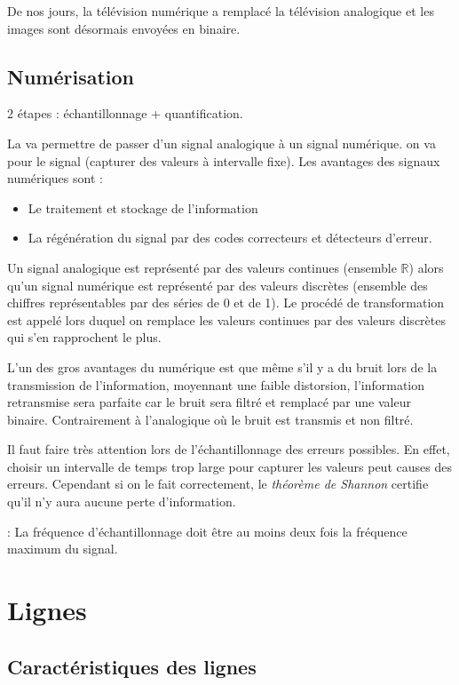 De nos jours, la télévision numérique a remplacé la télévision analogique et les images sont désormais envoyées en binaire.

\section{Numérisation}

2 étapes : échantillonnage + quantification.

La  va permettre de passer d'un signal analogique à un signal numérique. on va pour  le signal (capturer des valeurs à intervalle fixe). Les avantages des signaux numériques sont :
\begin{itemize}
\item Le traitement et stockage de l'information
\item La régénération du signal par des codes correcteurs et détecteurs d'erreur.
\end{itemize}

Un signal analogique est représenté par des valeurs continues (ensemble $\mathbb{R}$) alors qu'un signal numérique est représenté par des valeurs discrètes (ensemble des chiffres représentables par des séries de 0 et de 1). Le procédé de transformation est appelé  lors duquel on remplace les valeurs continues par des valeurs discrètes qui s'en rapprochent le plus.

L'un des gros avantages du numérique est que même s'il y a du bruit lors de la transmission de l'information, moyennant une faible distorsion, l'information retransmise sera parfaite car le bruit sera filtré et remplacé par une valeur binaire. Contrairement à l'analogique où le bruit est transmis et non filtré.

Il faut faire très attention lors de l'échantillonnage des erreurs possibles. En effet, choisir un intervalle de temps trop large pour capturer les valeurs peut causes des erreurs. Cependant si on le fait correctement, le \textit{théorème de Shannon} certifie qu'il n'y aura aucune perte d'information.

 : La fréquence d'échantillonnage doit être au moins deux fois la fréquence maximum du signal.

\chapter{Lignes}

\section{Caractéristiques des lignes}

